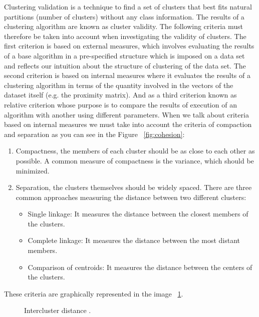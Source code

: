 Clustering validation is a technique to find a set of clusters that best fits natural partitions (number of clusters) without any class information. The results of a clustering algorithm are known as cluster validity. The following criteria must therefore be taken into account when investigating the validity of clusters. The first criterion is based on external measures, which involves evaluating the results of a base algorithm in a pre-specified structure which is imposed on a data set and reflects our intuition about the structure of clustering of the data set. The second criterion is based on internal measures where it evaluates the results of a clustering algorithm in terms of the quantity involved in the vectors of the dataset itself (e.g. the proximity matrix). And as a third criterion known as relative criterion whose purpose is to compare the results of execution of an algorithm with another using different parameters.
When we talk about criteria based on internal measures we must take into account the criteria of compaction and separation \citep{b53} \citep{b52} as you can see in the Figure ~\ref{fig:cohesion}:
\begin{enumerate}
  \item Compactness, the members of each cluster should be as close to each other as possible. A common measure of compactness is the variance, which should be minimized.
  \item Separation, the clusters themselves should be widely spaced. There are three common approaches measuring the distance between two different clusters:
  \begin{itemize}
  \item Single linkage: It measures the distance between the closest members of the clusters.
  \item Complete linkage: It measures the distance between the most distant members.
  \item Comparison of centroids: It measures the distance between the centers of the clusters.
\end{itemize}
\end{enumerate}
These criteria are graphically represented in the image ~\ref{fig:separation}.

\begin{figure}[htbp]
  \centering
    \caption{Intercluster distance \citep{b60}.}%
    \label{fig:separation}%
\end{figure}

